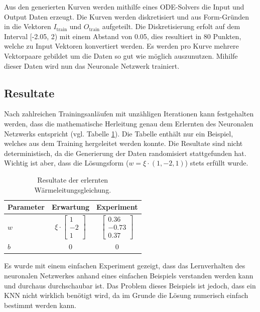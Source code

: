Aus den generierten Kurven werden mithilfe eines ODE-Solvers die Input und Output Daten erzeugt. Die Kurven werden diskretisiert und aus Form-Gründen in die Vektoren $I_{\text{train}}$ und $O_{\text{train}}$ aufgeteilt. Die Diskretisierung erfolt auf dem Interval [-2.05, 2) mit einem Abstand von 0.05, dies resultiert in 80 Punkten, welche zu Input Vektoren konvertiert werden. Es werden pro Kurve mehrere Vektorpaare gebildet um die Daten so gut wie möglich auszunutzen. Mihilfe dieser Daten wird nun das Neuronale Netzwerk trainiert.

\subsection{Resultate}
Nach zahlreichen Trainingsanläufen mit unzähligen Iterationen kann
festgehalten werden, dass die mathematische Herleitung genau dem
Erlernten des Neuronalen Netzwerks entspricht (vgl. Tabelle
\ref{tbl:result_heat}). Die Tabelle enthält nur ein Beispiel, welches
aus dem Training hergeleitet werden konnte. Die Resultate sind nicht
deterministisch, da die Generierung der Daten randomisiert stattgefunden
hat. Wichtig ist aber, dass die Lösungsform ($w = \xi \cdot (1, -2,
1)$) stets erfüllt wurde.

\begin{table}
	\centering
	\def\arraystretch{1.1}
	\begin{tabular}{l|c|c}
		Parameter & Erwartung & Experiment \\
		\hline
		$w$ & $\xi \cdot \begin{bmatrix} 1 \\ -2 \\ 1 \end{bmatrix}$ & $\begin{bmatrix} 0.36 \\ -0.73 \\ 0.37 \end{bmatrix}$ \\
		$b$ & 0 & 0 \\
	\end{tabular}
	\caption{Resultate der erlernten Wärmeleitungsgleichung.
	\label{tbl:result_heat} }
\end{table}

Es wurde mit einem einfachen Experiment gezeigt, dass das Lernverhalten des neuronalen Netzwerkes anhand eines einfachen Beispiels verstanden werden kann und durchaus durchschaubar ist. Das Problem dieses Beispiels ist jedoch, dass ein KNN nicht wirklich benötigt wird, da im Grunde die Lösung numerisch einfach bestimmt werden kann.
